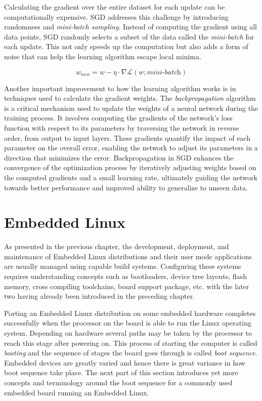 Calculating the gradient over the entire dataset for each update can be computationally expensive. SGD addresses this challenge by introducing randomness and \textit{mini-batch sampling}. Instead of computing the gradient using all data points, SGD randomly selects a subset of the data called the \textit{mini-batch} for each update. This not only speeds up the computation but also adds a form of noise that can help the learning algorithm escape local minima.

\begin{equation}
    w_{new} = w - \eta \cdot \nabla \mathcal{L}(w; \textit{mini-batch})
\end{equation}

Another important improvement to how the learning algorithm works is in techniques used to calculate the gradient weights. The \textit{backpropagation} algorithm is a critical mechanism used to update the weights of a neural network during the training process. It involves computing the gradients of the network's loss function with respect to its parameters by traversing the network in reverse order, from output to input layers. These gradients quantify the impact of each parameter on the overall error, enabling the network to adjust its parameters in a direction that minimizes the error. Backpropagation in SGD enhances the convergence of the optimization process by iteratively adjusting weights based on the computed gradients and a small learning rate, ultimately guiding the network towards better performance and improved ability to generalize to unseen data.

\section{Embedded Linux}

As presented in the previous chapter, the development, deployment, and maintenance of Embedded Linux distributions and their user mode applications are usually managed using capable build systems. Configuring these systems requires understanding concepts such as bootloaders, device tree layouts, flash memory, cross compiling toolchains, board support package, etc. with the later two having already been introduced in the preceding chapter.

Porting an Embedded Linux distribution on some embedded hardware completes successfully when the processor on the board is able to run the Linux operating system. Depending on hardware several paths may be taken by the processor to reach this stage after powering on. This process of starting the computer is called \textit{booting} and the sequence of stages the board goes through is called \textit{boot sequence}. Embedded devices are greatly varied and hence there is great variance in how boot sequence take place. The next part of this section introduces yet more concepts and terminology around the boot sequence for a commonly used embedded board running an Embedded Linux.

